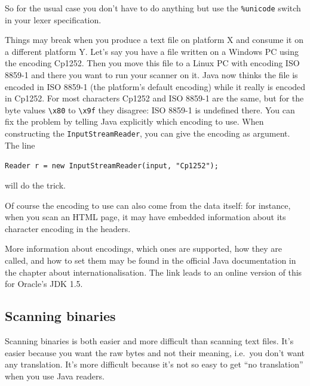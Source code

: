 \documentclass[11pt]{scrartcl}
\begin{document}
So for the usual case you don't have to do anything but use the
\texttt{\%unicode} switch in your lexer specification.

Things may break when you produce a text file on platform X and
consume it on a different platform Y. Let's say you have a file
written on a Windows PC using the encoding Cp1252. Then you move
this file to a Linux PC with encoding ISO 8859-1 and there you want
to run your scanner on it. Java now thinks the file is encoded
in ISO 8859-1 (the platform's default encoding) while it really is 
encoded in Cp1252. For most characters
Cp1252 and ISO 8859-1 are the same, but for the byte values \verb+\x80+
to \verb+\x9f+ they disagree: ISO 8859-1 is undefined there. You can fix
the problem by telling Java explicitly which encoding to use. When
constructing the \texttt{InputStreamReader}, you can give the encoding
as argument. The line
\begin{center}
\texttt{Reader r = new InputStreamReader(input, "Cp1252"); }
\end{center}
will do the trick.

Of course the encoding to use can also come from the data itself:
for instance, when you scan an HTML page, it may have embedded 
information about its character encoding in the headers.

More information about encodings, which ones are supported, how
they are called, and how to set them may be found in the
official Java documentation in the chapter about 
internationalisation. 
The link 
leads to an online version of this for Oracle's JDK 1.5.

\subsection{Scanning binaries}\label{sec:howtobinary}

Scanning binaries is both easier and more difficult
than scanning text files. It's easier because you want
the raw bytes and not their meaning, i.e.~you don't want 
any translation.
It's more difficult because it's not so easy to get
``no translation'' when you use Java readers. 
\end{document}
